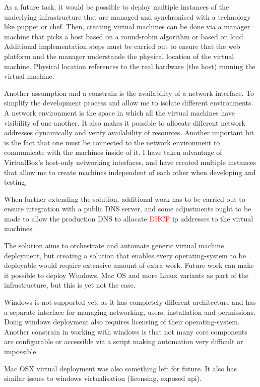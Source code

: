 \documentclass{article}
\begin{document}
As a future task, it would be possible to deploy multiple instances of the underlying infrastructure that are managed and synchronised with a technology like puppet or chef. Then, creating virtual machines can be done via a manager machine that picks a host based on a round-robin algorithm or based on load. Additional implementation steps must be carried out to ensure that the web platform and the manager understands the physical location of the virtual machine. Physical location references to the real hardware (the host) running the virtual machine.

Another assumption and a constrain is the availability of a network interface. To simplify the development process and allow me to isolate different environments. A network environment is the space in which all the virtual machines have visibility of one another. It also makes it possible to allocate different network addresses dynamically and verify availability of resources. Another important bit is the fact that one must be connected to the network environment to communicate with the machines inside of it. I have taken advantage of VirtualBox's host-only networking interfaces, and have created multiple instances that allow me to create machines independent of each other when developing and testing.

When further extending the solution, additional work has to be carried out to ensure integration with a public DNS server, and some adjustments ought to be made to allow the production DNS to allocate \textcolor{red}{DHCP} ip addresses to the virtual machines.

The solution aims to orchestrate and automate generic virtual machine deployment, but creating a solution that enables every \gls{operating-system} to be deployable would require extensive amount of extra work. Future work can make it possible to deploy Windows, Mac OS and more Linux variants as part of the infrastructure, but this is yet not the case.

Windows is not supported yet, as it has completely different architecture and has a separate interface for managing networking, users, installation and permissions. Doing windows deployment also requires licensing of their \gls{operating-system}. Another constrain in working with windows is that not many core components are configurable or accessible via a script making automation very difficult or impossible.

Mac OSX virtual deployment was also something left for future. It also has similar issues to windows virtualisation (licensing, exposed \gls{api}).
\end{document}
